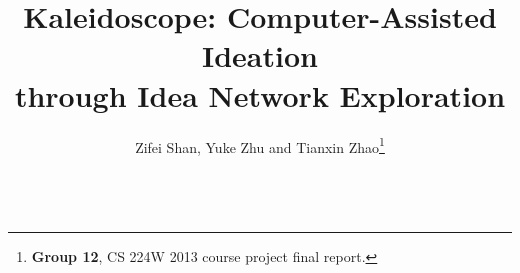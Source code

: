 \documentclass{sig-alternate}
\begin{document}


\title{Kaleidoscope: Computer-Assisted Ideation\\ through Idea Network Exploration}

\author{
\alignauthor
Zifei Shan, Yuke Zhu and Tianxin Zhao\thanks{\textbf{Group 12}, CS 224W 2013 course project final report.}\\
        \\
}

\maketitle


\begin{abstract}



\end{abstract}

\end{document}
